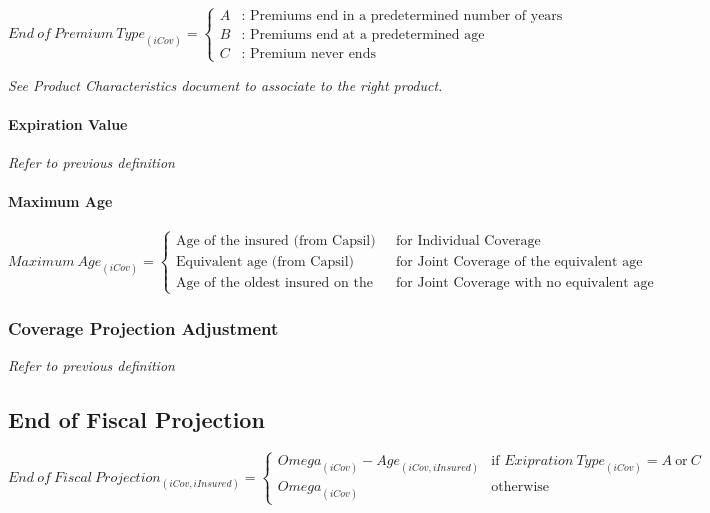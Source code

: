 \documentclass[10pt]{article}
\begin{document}
\[
{End\ of\ Premium\ Type}_{\left(iCov\right)} = \begin{cases}
A & \text{: Premiums end in a predetermined number of years} \\
B & \text{: Premiums end at a predetermined age} \\
C & \text{: Premium never ends}
\end{cases}
\]

\textit{See Product Characteristics document to associate to the right product.}

\paragraph{Expiration Value}
\textit{Refer to previous definition}

\paragraph{Maximum Age}

\[
{Maximum\ Age}_{\left(iCov\right)} = \begin{cases}
\text{Age of the insured (from Capsil)} & \text{for Individual Coverage} \\
\text{Equivalent age (from Capsil)} & \text{for Joint Coverage of the equivalent age type (ex: Permanent life products)} \\
\text{Age of the oldest insured on the coverage (from Capsil)} & \text{for Joint Coverage with no equivalent age (ex: Term life products)}
\end{cases}
\]

\subsubsection{Coverage Projection Adjustment}
\textit{Refer to previous definition}

\subsection{End of Fiscal Projection}

\[
{End\ of\ Fiscal\ Projection}_{\left(iCov,iInsured\right)} = \begin{cases}
{Omega}_{\left(iCov\right)} - {Age}_{\left(iCov,iInsured\right)} & \text{if } {Exipration\ Type}_{\left(iCov\right)} = A\ \text{or}\ C \\
{Omega}_{\left(iCov\right)} & \text{otherwise}
\end{cases}
\]
\end{document}
